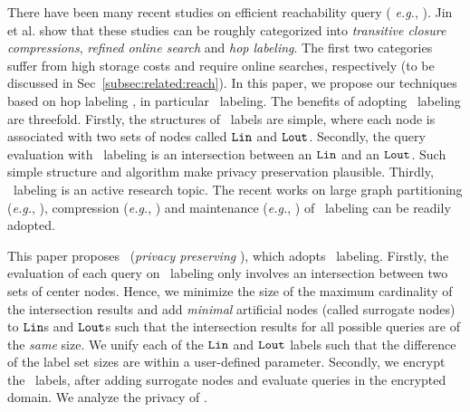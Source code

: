 There have been many recent studies  on efficient reachability query ({\it
e.g.}, \cite{pathtree, bitcompression,grail, gripp, ferrari,3hop, pathhop,
sigmod2013, hopi, chengjf1 ,chengjf2, byron}). Jin et al. \cite{sigmod2012}
show that these studies can be roughly categorized into {\em transitive closure
compressions}, {\em refined online search} and {\em hop labeling}. The first
two categories suffer from high storage costs and require
online searches, respectively (to be discussed in
Sec~\ref{subsec:related:reach}).
In this paper, we propose our techniques based on hop  labeling
\cite{cohen}, in particular \hop\ labeling. The benefits of adopting \hop\ labeling are
threefold. Firstly, the structures of \hop\ labels are simple, where
each node is associated with two sets of nodes called ${\tt Lin}$ and
${\tt Lout}$. Secondly, the query evaluation with \hop\ labeling is
an intersection between an ${\tt Lin}$ and an ${\tt Lout}$. Such simple
structure and algorithm make privacy
preservation plausible. Thirdly, \hop\ labeling is an active research
topic. The recent works on large graph  partitioning ({\it e.g.}, \cite{chengjf2}),
compression ({\it e.g.}, \cite{chengjf1}) and maintenance ({\it e.g.},
\cite{hopi,byron}) of \hop\ labeling can be readily adopted.




This paper proposes \pphop\ ({\em privacy preserving \hop}), which adopts
\hop\ labeling. 
Firstly, 
the evaluation of each query on \hop\ labeling only involves an intersection between
two sets of center nodes.  Hence, we minimize the size of the
maximum cardinality of the intersection results and add {\em minimal}
artificial nodes (called surrogate nodes) to ${\tt Lin}$s and ${\tt Lout}$s such
that the intersection results for all possible queries are of the {\em
  same} size. We  unify each of the ${\tt Lin}$ and ${\tt Lout}$
labels such that the difference of the label set sizes are
within a user-defined parameter.
Secondly, we encrypt the \hop\ labels, after adding surrogate nodes
and evaluate queries in the encrypted domain. We analyze the privacy
of \pphop.



